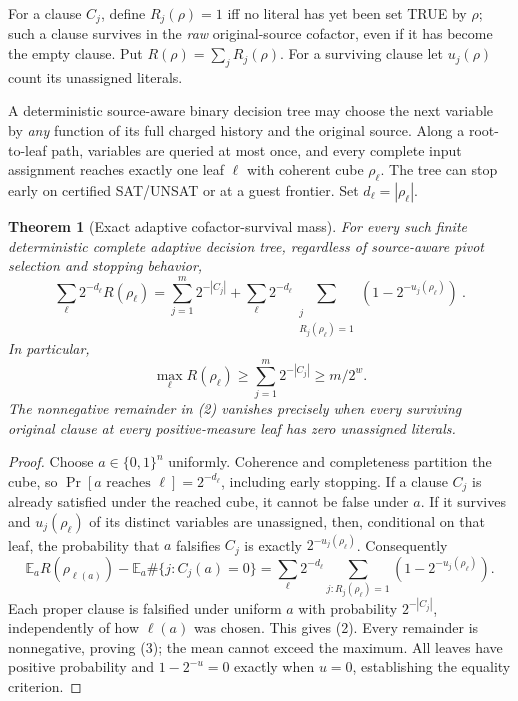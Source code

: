 \documentclass[11pt]{article}
\newtheorem{theorem}{Theorem}
\begin{document}
For a clause $C_j$, define $R_j(\rho)=1$ iff no literal has yet been set TRUE by $\rho$; such a clause survives in the \emph{raw} original-source cofactor, even if it has become the empty clause. Put $R(\rho)=\sum_jR_j(\rho)$. For a surviving clause let $u_j(\rho)$ count its unassigned literals.

A deterministic source-aware binary decision tree may choose the next variable by \emph{any} function of its full charged history and the original source. Along a root-to-leaf path, variables are queried at most once, and every complete input assignment reaches exactly one leaf $\ell$ with coherent cube $\rho_\ell$. The tree can stop early on certified SAT/UNSAT or at a guest frontier. Set $d_\ell=|\rho_\ell|$.

\begin{theorem}[Exact adaptive cofactor-survival mass]\label{thm:mass}
For \emph{every} such finite deterministic complete adaptive decision tree, regardless of source-aware pivot selection and stopping behavior,
\[
\boxed{\ \sum_{\ell}2^{-d_\ell}R(\rho_\ell)
 =\sum_{j=1}^{m}2^{-|C_j|}
 +\sum_{\ell}2^{-d_\ell}
   \sum_{\substack{j\\R_j(\rho_\ell)=1}}
        (1-2^{-u_j(\rho_\ell)})\ .\ }\tag{2}
\]
In particular,
\[
\boxed{\quad\max_\ell R(\rho_\ell)
\ge\sum_{j=1}^{m}2^{-|C_j|}
\ge m/2^{w}.\quad}\tag{3}
\]
The nonnegative remainder in (2) vanishes precisely when every surviving original clause at every positive-measure leaf has zero unassigned literals.
\end{theorem}
\begin{proof}
Choose $a\in\{0,1\}^n$ uniformly. Coherence and completeness partition the cube, so $\Pr[a\text{ reaches }\ell]=2^{-d_\ell}$, including early stopping. If a clause $C_j$ is already satisfied under the reached cube, it cannot be false under $a$. If it survives and $u_j(\rho_\ell)$ of its distinct variables are unassigned, then, conditional on that leaf, the probability that $a$ falsifies $C_j$ is exactly $2^{-u_j(\rho_\ell)}$. Consequently
\[
\mathbb E_a R(\rho_{\ell(a)})
-\mathbb E_a \#\{j:C_j(a)=0\}
=\sum_\ell 2^{-d_\ell}
  \sum_{j:R_j(\rho_\ell)=1}(1-2^{-u_j(\rho_\ell)}).
\]
Each proper clause is falsified under uniform $a$ with probability $2^{-|C_j|}$, independently of how $\ell(a)$ was chosen. This gives (2). Every remainder is nonnegative, proving (3); the mean cannot exceed the maximum. All leaves have positive probability and $1-2^{-u}=0$ exactly when $u=0$, establishing the equality criterion.
\end{proof}
\end{document}
